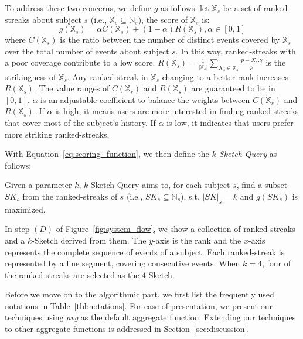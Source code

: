 To address these two concerns, we define $g$ as follows: 
let $\mathbb{X}_s$ be a set of ranked-streaks about subject $s$ (i.e., $\mathbb{X}_s \subseteq \mathbb{N}_s$), 
the score of $\mathbb{X}_s $ is:
\begin{equation}
	\label{eq:scoring_function}
	g (\mathbb{X}_s) = \alpha C(\mathbb{X}_s) + (1-\alpha) R(\mathbb{X}_s), \alpha \in [0,1]
\end{equation}
where $C(\mathbb{X}_s)$ is the ratio between the number of distinct events covered by $\mathbb{X}_s$ 
over the total number of events about subject $s$. In this way, ranked-streaks with a poor coverage
contribute to a low score. $R(\mathbb{X}_s) = \frac{1}{|\mathbb{X}_s|}\sum_{X_s \in \mathbb{X}_s} \frac{p-X_s.\gamma}{p}$ is the strikingness of $\mathbb{X}_s$. Any ranked-streak in 
$\mathbb{X}_s$ changing to a better rank increases $R(\mathbb{X}_s)$. The value ranges of $C(\mathbb{X}_s)$ and $R(\mathbb{X}_s)$ are guaranteed to be in $[0,1]$. $\alpha$ is an adjustable coefficient to balance the weights between $C(\mathbb{X}_s)$ and $R(\mathbb{X}_s)$. If $\alpha$ is high, it means users are more interested in finding ranked-streaks that cover most of the subject's history.  If $\alpha$ is low, it indicates that users prefer more striking ranked-streaks.

With Equation~\ref{eq:scoring_function}, we then define the \emph{$k$-Sketch Query} as follows:

\begin{definition} 
Given a parameter $k$, $k$-Sketch Query aims to, for each subject $s$, 
find a subset $SK_s$ from the ranked-streaks of $s$ (i.e., $SK_s \subseteq \mathbb{N}_s$), s.t. $|SK|_s = k$ and $g(SK_s)$ is maximized.
\end{definition}

\begin{example}  
In step $(D)$ of Figure~\ref{fig:system_flow}, we show a collection of ranked-streaks and a $k$-Sketch derived from them. The $y$-axis is the rank and the $x$-axis represents the complete sequence of events of a subject. 
Each ranked-streak is represented by a line segment, covering consecutive events. When $k=4$, four of the ranked-streaks are selected as the $4$-Sketch.%
\end{example}

Before we move on to the algorithmic part, we first list the frequently used notations in Table~\ref{tbl:notations}. For 
ease of presentation, we present our techniques using \emph{avg} as the default aggregate function. Extending our techniques to other aggregate functions is addressed in Section~\ref{sec:discussion}.


